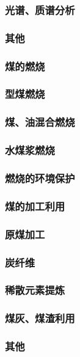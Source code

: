 \documentclass[UTF8]{../../ApplicationUniverse}
\begin{document}
    \subsubsection{光谱、质谱分析}
    \subsubsection{其他}
\subsubsection{煤的燃烧}
    \subsubsection{型煤燃烧}
    \subsubsection{煤、油混合燃烧}
    \subsubsection{水煤浆燃烧}
    \subsubsection{燃烧的环境保护}
\subsubsection{煤的加工利用}
    \subsubsection{原煤加工}
    \subsubsection{炭纤维}
    \subsubsection{稀散元素提炼}
    \subsubsection{煤灰、煤渣利用}
    \subsubsection{其他}
\end{document}
